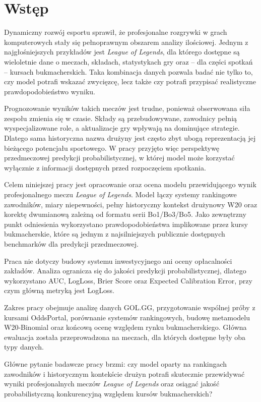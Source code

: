 \chapter{Wstęp}

Dynamiczny rozwój esportu sprawił, że profesjonalne rozgrywki w grach komputerowych stały się
pełnoprawnym obszarem analizy ilościowej. Jednym z najgłośniejszych przykładów jest \textit{League
of Legends}, dla którego dostępne są wieloletnie dane o meczach, składach, statystykach gry oraz --
dla części spotkań -- kursach bukmacherskich. Taka kombinacja danych pozwala badać nie tylko to, czy
model potrafi wskazać zwycięzcę, lecz także czy potrafi przypisać realistyczne prawdopodobieństwo
wyniku.

Prognozowanie wyników takich meczów jest trudne, ponieważ obserwowana siła zespołu zmienia się w
czasie. Składy są przebudowywane, zawodnicy pełnią wyspecjalizowane role, a aktualizacje gry
wpływają na dominujące strategie. Dlatego sama historyczna nazwa drużyny jest często zbyt ubogą
reprezentacją jej bieżącego potencjału sportowego. W pracy przyjęto więc perspektywę przedmeczowej
predykcji probabilistycznej, w której model może korzystać wyłącznie z informacji dostępnych przed
rozpoczęciem spotkania.

Celem niniejszej pracy jest opracowanie oraz ocena modelu przewidującego wynik profesjonalnego meczu
\textit{League of Legends}. Model łączy systemy rankingowe zawodników, miary niepewności, pełny
historyczny kontekst drużynowy W20 oraz korektę dwumianową zależną od formatu serii Bo1/Bo3/Bo5.
Jako zewnętrzny punkt odniesienia wykorzystano prawdopodobieństwa implikowane przez kursy
bukmacherskie, które są jednym z najsilniejszych publicznie dostępnych benchmarków dla predykcji
przedmeczowej.

Praca nie dotyczy budowy systemu inwestycyjnego ani oceny opłacalności zakładów. Analiza ogranicza
się do jakości predykcji probabilistycznej, dlatego wykorzystano AUC, LogLoss, Brier Score oraz
Expected Calibration Error, przy czym główną metryką jest LogLoss.

Zakres pracy obejmuje analizę danych GOL.GG, przygotowanie wspólnej próby z kursami OddsPortal,
porównanie systemów rankingowych, budowę metamodelu W20-Binomial oraz końcową ocenę względem rynku
bukmacherskiego. Główna ewaluacja została przeprowadzona na meczach, dla których dostępne były oba
typy danych.

Główne pytanie badawcze pracy brzmi: czy model oparty na rankingach zawodników i historycznym
kontekście drużyn potrafi skutecznie przewidywać wyniki profesjonalnych meczów \textit{League of
Legends} oraz osiągać jakość probabilistyczną konkurencyjną względem kursów bukmacherskich?


